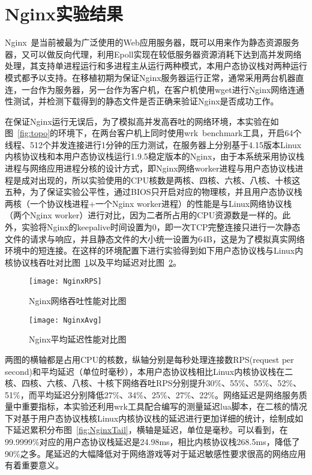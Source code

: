 \section{Nginx实验结果}
Nginx~\cite{Nginx}是当前被最为广泛使用的Web应用服务器，既可以用来作为静态资源服务器，又可以做反向代理，利用Epoll实现在较低服务器资源消耗下达到高并发网络处理，其支持单进程运行和多进程主从运行两种模式，本用户态协议栈对两种运行模式都予以支持。在移植初期为保证Nginx服务器运行正常，通常采用两台机器直连，一台作为服务器，另一台作为客户机，在客户机使用wget进行Nginx网络连通性测试，并检测下载得到的静态文件是否正确来验证Nginx是否成功工作。

在保证Nginx运行无误后，为了模拟高并发高吞吐的网络环境，本实验在如图~\ref{fig:topo}的环境下，在两台客户机上同时使用wrk~\cite{wrk}benchmark工具，开启64个线程、512个并发连接进行1分钟的压力测试，在服务器上分别基于4.15版本Linux内核协议栈和本用户态协议栈运行1.9.5稳定版本的Nginx，由于本系统采用协议栈进程与网络应用进程分核的设计方式，即Nginx网络worker进程与用户态协议栈进程是成对出现的，所以实验使用的CPU核数是两核、四核、六核、八核、十核这五种，为了保证实验公平性，通过BIOS只开启对应的物理核，并且用户态协议栈两核（一个协议栈进程+一个Nginx worker进程）的性能是与Linux网络协议栈（两个Nginx worker）进行对比，因为二者所占用的CPU资源数是一样的。此外，实验将Nginx的keepalive时间设置为0，即一次TCP完整连接只进行一次静态文件的请求与响应，并且静态文件的大小统一设置为64B，这是为了模拟真实网络环境中的短连接。在这样的环境配置下进行实验得到如下用户态协议栈与Linux内核协议栈吞吐对比图~\ref{fig:NginxRPS}以及平均延迟对比图~\ref{fig:NginxAvg}。

\vspace{-10pt}
\begin{figure}[H] %
  \centering
  \texttt{[image: NginxRPS]}
  \caption{Nginx网络吞吐性能对比图}
  \label{fig:NginxRPS}
\end{figure}
\vspace{-10pt}

\vspace{-10pt}
\begin{figure}[H] %
  \centering
  \texttt{[image: NginxAvg]}
  \caption{Nginx平均延迟性能对比图}
  \label{fig:NginxAvg}
\end{figure}
\vspace{-10pt}

两图的横轴都是占用CPU的核数，纵轴分别是每秒处理连接数RPS(request per second)和平均延迟（单位时毫秒），本用户态协议栈相比Linux内核协议栈在二核、四核、六核、八核、十核下网络吞吐RPS分别提升30\%、55\%、55\%、52\%、51\%，而平均延迟分别降低27\%、34\%、25\%、27\%、22\%。网络延迟是网络服务质量中重要指标，本实验还利用wrk工具配合编写的测量延迟lua脚本，在二核的情况下对基于用户态协议栈核Linux内核协议栈的延迟进行更加详细的统计，绘制成如下延迟累积分布图~\ref{fig:NginxTail}，横轴是延迟，单位是毫秒。可以看到，在99.9999\%对应的用户态协议栈延迟是24.98ms，相比内核协议栈268.5ms，降低了90\%之多。尾延迟的大幅降低对于网络游戏等对于延迟敏感性要求很高的网络应用有着重要意义。

